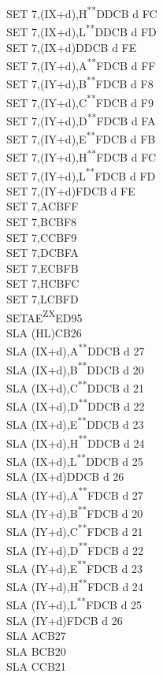 \documentclass[12pt,twoside,openright,a4paper]{book}
\newcommand{\UNDOC}{\textnormal{\textsuperscript{**}}}
\newcommand{\ZXN}{\textnormal{\textsuperscript{ZX}}}
\begin{document}
\begin{multicols}{3}
{\begin{tabbing}
	SET 7,(IX+d),H\UNDOC\>DDCB d FC\\
	SET 7,(IX+d),L\UNDOC\>DDCB d FD\\
	SET 7,(IX+d)\>DDCB d FE\\
	SET 7,(IY+d),A\UNDOC\>FDCB d FF\\
	SET 7,(IY+d),B\UNDOC\>FDCB d F8\\
	SET 7,(IY+d),C\UNDOC\>FDCB d F9\\
	SET 7,(IY+d),D\UNDOC\>FDCB d FA\\
	SET 7,(IY+d),E\UNDOC\>FDCB d FB\\
	SET 7,(IY+d),H\UNDOC\>FDCB d FC\\
	SET 7,(IY+d),L\UNDOC\>FDCB d FD\\
	SET 7,(IY+d)\>FDCB d FE\\
	SET 7,A\>CBFF\\
	SET 7,B\>CBF8\\
	SET 7,C\>CBF9\\
	SET 7,D\>CBFA\\
	SET 7,E\>CBFB\\
	SET 7,H\>CBFC\\
	SET 7,L\>CBFD\\
	SETAE\ZXN\>ED95\\
	SLA (HL)\>CB26\\
	SLA (IX+d),A\UNDOC\>DDCB d 27\\
	SLA (IX+d),B\UNDOC\>DDCB d 20\\
	SLA (IX+d),C\UNDOC\>DDCB d 21\\
	SLA (IX+d),D\UNDOC\>DDCB d 22\\
	SLA (IX+d),E\UNDOC\>DDCB d 23\\
	SLA (IX+d),H\UNDOC\>DDCB d 24\\
	SLA (IX+d),L\UNDOC\>DDCB d 25\\
	SLA (IX+d)\>DDCB d 26\\
	SLA (IY+d),A\UNDOC\>FDCB d 27\\
	SLA (IY+d),B\UNDOC\>FDCB d 20\\
	SLA (IY+d),C\UNDOC\>FDCB d 21\\
	SLA (IY+d),D\UNDOC\>FDCB d 22\\
	SLA (IY+d),E\UNDOC\>FDCB d 23\\
	SLA (IY+d),H\UNDOC\>FDCB d 24\\
	SLA (IY+d),L\UNDOC\>FDCB d 25\\
	SLA (IY+d)\>FDCB d 26\\
	SLA A\>CB27\\
	SLA B\>CB20\\
	SLA C\>CB21\\

\end{tabbing}}
\end{multicols}
\end{document}
